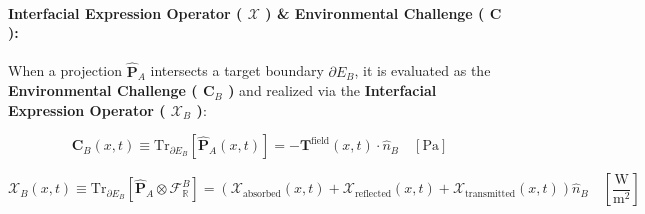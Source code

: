 \documentclass[11pt,a4paper]{article}
\theoremstyle{definition}\newtheorem{definition}{Definition}
\theoremstyle{remark}\newtheorem{remark}{Remark}
\begin{document}
\paragraph{Interfacial Expression Operator ( $\boldsymbol{\mathcal{X}}$ ) \& Environmental Challenge ( $\mathbf{C}$ ):}

When a projection $\hat{\mathbf{P}}_A$ intersects a target boundary $\partial E_B$, it is evaluated as the \textbf{Environmental Challenge ( $\mathbf{C}_B$ )} and realized via the \textbf{Interfacial Expression Operator ( $\boldsymbol{\mathcal{X}}_B$ )}:


\begin{equation}
\boxed{\mathbf{C}_B(x, t) \equiv \mathrm{Tr}_{\partial E_B}[ \hat{\mathbf{P}}_A(x, t) ] = -\mathbf{T}^{\text{field}}(x, t) \cdot \hat{n}_B \quad [\mathrm{Pa}]}
\end{equation}



\begin{equation}
\boxed{\boldsymbol{\mathcal{X}}_B(x, t) \equiv \mathrm{Tr}_{\partial E_B}[ \hat{\mathbf{P}}_A \otimes \mathcal{F}_{\mathbb{R}}^B ] = \left( \mathcal{X}_{\text{absorbed}}(x, t) + \mathcal{X}_{\text{reflected}}(x, t) + \mathcal{X}_{\text{transmitted}}(x, t) \right) \hat{n}_B \quad [\frac{\mathrm{W}}{\mathrm{m^2}}]}
\end{equation}
\end{document}
